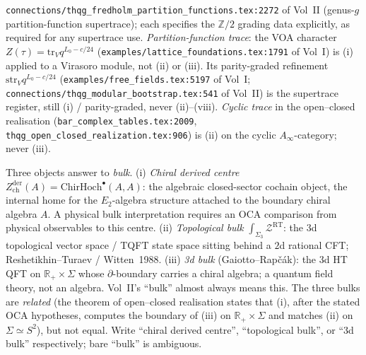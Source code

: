 \begin{description}[itemsep=4pt, leftmargin=2.0em, style=nextline]
\texttt{connections/thqg\_fredholm\_partition\_functions.tex:2272}
of Vol~II (genus-$g$ partition-function supertrace); each specifies
the $\mathbb{Z}/2$ grading data explicitly, as required for any
supertrace use.
\emph{Partition-function trace}: the VOA character
$Z(\tau) = \mathrm{tr}_V q^{L_0 - c/24}$
(\texttt{examples/lattice\_foundations.tex:1791} of Vol~I) is (i)
applied to a Virasoro module, not (ii) or (iii). Its
parity-graded refinement $\mathrm{str}_V q^{L_0 - c/24}$
(\texttt{examples/free\_fields.tex:5197} of Vol~I;
\texttt{connections/thqg\_modular\_bootstrap.tex:541} of Vol~II)
is the supertrace register, still (i) / parity-graded, never
(ii)--(viii).
\emph{Cyclic trace} in the open--closed realisation
(\texttt{bar\_complex\_tables.tex:2009},
\texttt{thqg\_open\_closed\_realization.tex:906}) is (ii) on the
cyclic $A_\infty$-category; never (iii).

\item[T18 (``bulk''--three distinct constituents).]
%
Three objects answer to \emph{bulk}.
(i) \emph{Chiral derived centre}
$Z^{\mathrm{der}}_{\mathrm{ch}}(A) = \mathrm{ChirHoch}^\bullet(A, A)$:
the algebraic closed-sector cochain object, the internal home for the
$E_2$-algebra structure attached to the boundary chiral algebra $A$.
A physical bulk interpretation requires an OCA comparison from physical
observables to this centre.
(ii) \emph{Topological bulk}
$\int_{\Sigma_3} \mathcal Z^{\mathrm{RT}}$: the $3$d topological
vector space / TQFT state space sitting behind a $2$d rational
CFT; Reshetikhin--Turaev / Witten~1988.
(iii) \emph{3d bulk} (Gaiotto--Rapč\'ak): the 3d HT QFT on
$\mathbb R_+ \times \Sigma$ whose $\partial$-boundary carries a
chiral algebra; a quantum field theory, not an algebra. Vol~II's
``bulk'' almost always means this.
The three bulks are \emph{related} (the theorem of open--closed
realisation states that (i), after the stated OCA hypotheses, computes
the boundary of (iii) on
$\mathbb R_+ \times \Sigma$ and matches (ii) on
$\Sigma \simeq S^2$), but not equal. Write ``chiral derived
centre'', ``topological bulk'', or ``3d bulk'' respectively; bare
``bulk'' is ambiguous.


\end{description}
